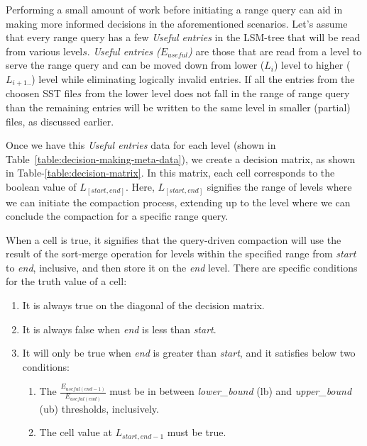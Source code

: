 Performing a small amount of work before initiating a range query can aid in making more informed decisions in the 
aforementioned scenarios. Let's assume that every range query has a few \textit{Useful entries} in the LSM-tree that will 
be read from various level\(s\). \textit{Useful entries ($E_{useful}$)} are those that are read from a level to serve the range 
query and can be moved down from lower ($L_i$) level to higher ($L_{i+1..}$) level while eliminating logically invalid entries.
If all the entries from the choosen SST file\(s\) from the lower level does not fall in the range of range query than the remaining entries 
will be written to the same level in smaller (partial) files, as discussed earlier.

Once we have this \textit{Useful entries} data for each level (shown in Table~\ref{table:decision-making-meta-data}), we create a decision matrix, as shown in Table-\ref{table:decision-matrix}. 
In this matrix, each cell corresponds to the boolean value of $L_{[start, end]}$. Here, $L_{[start, end]}$ signifies the 
range of levels where we can initiate the compaction process, extending up to the level where we can conclude the 
compaction for a specific range query. 

When a cell is true, it signifies that the query-driven compaction will use the result of the sort-merge operation for 
levels within the specified range from \textit{start} to \textit{end}, inclusive, and then store it on the \textit{end} level.
There are specific conditions for the truth value of a cell: 
\begin{enumerate}[leftmargin=*,labelindent=0mm, itemsep=0.2\baselineskip]
    \item It is always true on the diagonal of the decision matrix.
    \item It is always false when \textit{end} is less than \textit{start}.
    \item It will only be true when \textit{end} is greater than \textit{start}, and it satisfies below two conditions:
    \begin{enumerate}[leftmargin=*,labelindent=0mm, itemsep=0.2\baselineskip]
        \item The $\frac{E_{useful(end-1)}}{E_{useful(end)}}$ must be in between \textit{lower\_bound} (lb) and 
        \textit{upper\_bound} (ub) thresholds, inclusively.
        \item The cell value at $L_{start, end-1}$ must be true.        
    \end{enumerate}
\end{enumerate}

